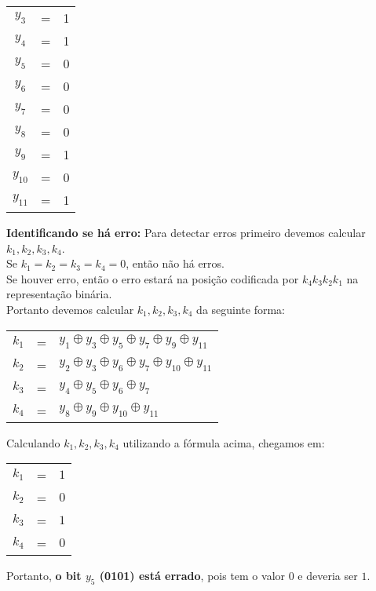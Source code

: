 \documentclass[12pt]{article}
\begin{document}
\begin{itemize}
\begin{center}
\begin{tabular}{ccc}
					$y_3$ & = & 1\\
					$y_4$ & = & 1\\
					$y_5$ & = & 0\\
					$y_6$ & = & 0\\
					$y_7$ & = & 0\\
					$y_8$ & = & 0\\
					$y_9$ & = & 1\\
					$y_{10}$ & = & 0\\
					$y_{11}$ & = & 1\\
				\end{tabular}
			\end{center}
			\subitem\textbf{Identificando se há erro:}
					\hfill\newline
					Para detectar erros primeiro devemos calcular $k_1, k_2, k_3, k_4$.\\
					Se $k_1 = k_2 = k_3 = k_4 = 0$, então não há erros.\\
					Se houver erro, então o erro estará na posição codificada  por $k_4k_3k_2k_1$
					na representação binária.\\
					Portanto devemos calcular $k_1, k_2, k_3, k_4$ da seguinte forma:
					\begin{center}
						\begin{tabular}{ccl}
							$k_1$ & = & $y_1 \oplus y_3 \oplus y_5 \oplus y_7 \oplus y_9 \oplus y_{11}$\\
							$k_2$ & = & $y_2 \oplus y_3 \oplus y_6 \oplus y_7 \oplus y_{10} \oplus y_{11}$\\
							$k_3$& = & $y_4 \oplus y_5 \oplus y_6 \oplus y_7$\\
							$k_4$ & = & $y_8 \oplus y_9 \oplus y_{10} \oplus y_{11}$\\
						\end{tabular}
					\end{center}
					Calculando $k_1, k_2, k_3, k_4$ utilizando a fórmula acima, chegamos em:\\
					\begin{center}
						\begin{tabular}{ccl}
							$k_1$ & = & $1$\\
							$k_2$ & = & $0$\\
							$k_3$& = & $1$\\
							$k_4$ & = & $0$\\
						\end{tabular}
					\end{center}
					Portanto, \textbf{o bit $y_5$ (0101) está errado}, pois tem o valor $0$ e 
					deveria ser $1$.
	\end{itemize}
\end{document}
